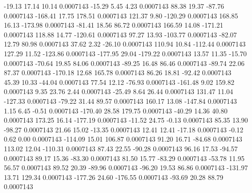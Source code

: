       -19.13       17.14       10.14     0.0007143
      -15.29        5.45        4.23     0.0007143
       88.38       19.37      -87.76     0.0007143
     -168.41       17.75      178.51     0.0007143
      121.37        9.80     -120.29     0.0007143
      168.85       16.13     -173.98     0.0007143
      -81.41       18.56       86.72     0.0007143
      166.59       14.08     -171.21     0.0007143
      118.88       14.77     -120.61     0.0007143
       97.27       13.93     -103.77     0.0007143
      -82.07       12.79       80.98     0.0007143
       37.62        2.32      -26.10     0.0007143
      110.94       10.84     -112.44     0.0007143
      127.29       11.52     -123.86     0.0007143
     -177.95       29.04     -179.22     0.0007143
       13.57       11.35      -15.70     0.0007143
      -70.64       19.85       84.06     0.0007143
      -89.25       16.48       86.46     0.0007143
      -89.74       22.06       87.37     0.0007143
     -170.18       12.68      165.78     0.0007143
       86.26       18.81      -92.42     0.0007143
       45.39       10.33      -44.04     0.0007143
       77.54       12.12      -76.93     0.0007143
     -161.48        9.02      159.82     0.0007143
        9.35       23.76        2.44     0.0007143
      -25.49        8.64       26.44     0.0007143
      131.47       11.04     -127.33     0.0007143
      -79.22       31.44       89.57     0.0007143
      160.17       13.08     -147.84     0.0007143
        1.15        6.45       -0.51     0.0007143
     -170.40       28.58      179.75     0.0007143
      -40.29       14.36       40.80     0.0007143
      173.25       16.14     -177.19     0.0007143
      -11.52       24.75       -0.13     0.0007143
       85.35       13.90      -98.27     0.0007143
       21.66       15.02      -13.35     0.0007143
       12.41       12.41      -17.18     0.0007143
       -0.12        0.62        0.00     0.0007143
     -114.09       15.01      106.87     0.0007143
       91.20       16.71      -84.68     0.0007143
      113.02       12.04     -110.31     0.0007143
       87.43       22.55      -90.28     0.0007143
       96.16       17.53      -94.57     0.0007143
       89.17       15.36      -83.30     0.0007143
       81.50       15.77      -83.29     0.0007143
      -53.78       11.95       56.57     0.0007143
       89.52       20.39      -89.96     0.0007143
      -96.20       19.53       86.86     0.0007143
     -131.97       13.71      129.34     0.0007143
     -177.26       24.60     -176.55     0.0007143
      -93.69       20.28       88.79     0.0007143
